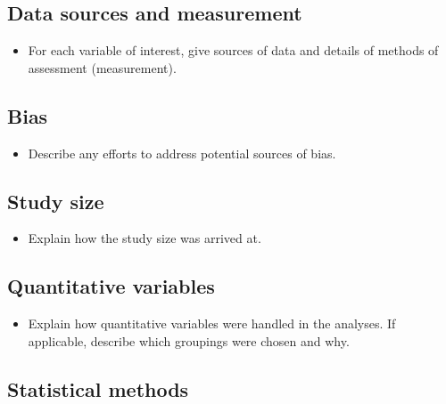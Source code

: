 \documentclass[
  letterpaper,
  DIV=11,
  numbers=noendperiod]{scrartcl}
\providecommand{\tightlist}{%
  \setlength{\itemsep}{0pt}\setlength{\parskip}{0pt}}\usepackage{longtable,booktabs,array}
\begin{document}
\subsection{Data sources and measurement}\label{sec-dat-sources}

\begin{itemize}
\tightlist
\item
  For each variable of interest, give sources of data and details of
  methods of assessment (measurement).
\end{itemize}

\subsection{Bias}\label{sec-bias}

\begin{itemize}
\tightlist
\item
  Describe any efforts to address potential sources of bias.
\end{itemize}

\subsection{Study size}\label{sec-size}

\begin{itemize}
\tightlist
\item
  Explain how the study size was arrived at.
\end{itemize}

\subsection{Quantitative variables}\label{sec-quant-vars}

\begin{itemize}
\tightlist
\item
  Explain how quantitative variables were handled in the analyses. If
  applicable, describe which groupings were chosen and why.
\end{itemize}

\subsection{Statistical methods}\label{sec-stat-methods}
\end{document}

